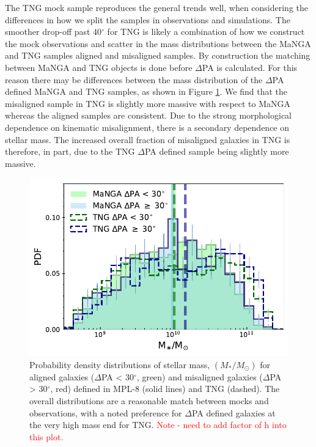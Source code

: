 \documentclass[fleqn,usenatbib]{mnras}
\newcommand{\red}[1]{{\textcolor{red}{#1}}}
\begin{document}
The TNG mock sample reproduces the general trends well, when considering the differences in how we split the samples in observations and simulations. The smoother drop-off past 40$^{\circ}$ for TNG is likely a combination of how we construct the mock observations and scatter in the mass distributions between the MaNGA and TNG samples aligned and misaligned samples. By construction the matching between MaNGA and TNG objects is done before $\Delta$PA is calculated. For this reason there may be differences between the mass distribution of the $\Delta$PA defined MaNGA and TNG samples, as shown in Figure \ref{fig:TNG_mpl8_stelM}. We find that the misaligned sample in TNG is slightly more massive with respect to MaNGA whereas the aligned samples are consistent. Due to the strong morphological dependence on kinematic misalignment, there is a secondary dependence on stellar mass. The increased overall fraction of misaligned galaxies in TNG is therefore, in part, due to the TNG $\Delta$PA defined sample being slightly more massive.

\begin{figure}
	\includegraphics[width=\linewidth]{tng_appendix/delPA_split_stelM_tng_comparison.pdf}
    \caption{Probability density distributions of stellar mass, $(M_{\ast}/M_{\odot})$ for aligned galaxies ($\Delta$PA < 30$^{\circ}$, green) and misaligned galaxies ($\Delta$PA > 30$^{\circ}$, red) defined in MPL-8 (solid lines) and TNG (dashed). The overall distributions are a reasonable match between mocks and observations, with a noted preference for $\Delta$PA defined galaxies at the very high mass end for TNG. \red{Note - need to add factor of h into this plot.}}
    \label{fig:TNG_mpl8_stelM}
\end{figure}
\end{document}
